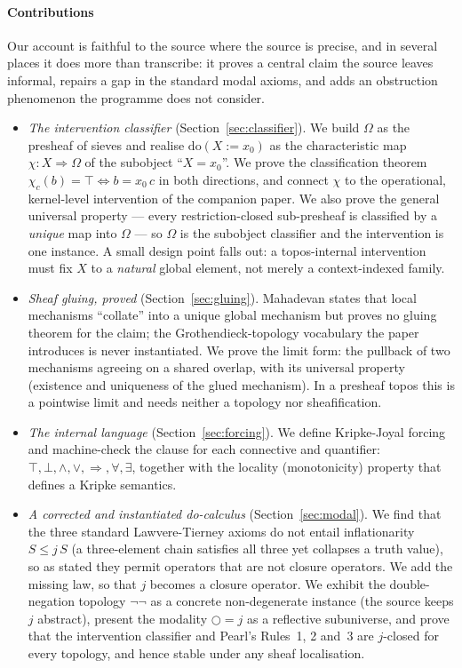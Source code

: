 \documentclass{lmcs}
\newcommand{\Om}{\Omega}
\newcommand{\dom}[2]{\mathrm{do}(#1\!:=\!#2)}
\newcommand{\cl}{\bigcirc}
\newcommand{\nn}{\neg\neg}
\begin{document}
\paragraph{Contributions}
Our account is faithful to the source where the source is precise, and in several places it does more than transcribe: it proves a central claim the source leaves informal, repairs a gap in the standard modal axioms, and adds an obstruction phenomenon the programme does not consider.
\begin{itemize}
\item \emph{The intervention classifier} (Section~\ref{sec:classifier}). We build $\Om$ as the presheaf of sieves and realise $\dom{X}{x_0}$ as the characteristic map $\chi : X \Rightarrow \Om$ of the subobject ``$X = x_0$''. We prove the classification theorem $\chi_c(b) = \top \iff b = x_0\,c$ in both directions, and connect $\chi$ to the operational, kernel-level intervention of the companion paper. We also prove the general universal property --- every restriction-closed sub-presheaf is classified by a \emph{unique} map into $\Om$ --- so $\Om$ is the subobject classifier and the intervention is one instance. A small design point falls out: a topos-internal intervention must fix $X$ to a \emph{natural} global element, not merely a context-indexed family.
\item \emph{Sheaf gluing, proved} (Section~\ref{sec:gluing}). Mahadevan states that local mechanisms ``collate'' into a unique global mechanism but proves no gluing theorem for the claim; the Grothendieck-topology vocabulary the paper introduces is never instantiated. We prove the limit form: the pullback of two mechanisms agreeing on a shared overlap, with its universal property (existence and uniqueness of the glued mechanism). In a presheaf topos this is a pointwise limit and needs neither a topology nor sheafification.
\item \emph{The internal language} (Section~\ref{sec:forcing}). We define Kripke-Joyal forcing and machine-check the clause for each connective and quantifier: $\top, \bot, \wedge, \vee, \Rightarrow, \forall, \exists$, together with the locality (monotonicity) property that defines a Kripke semantics.
\item \emph{A corrected and instantiated do-calculus} (Section~\ref{sec:modal}). We find that the three standard Lawvere-Tierney axioms do not entail inflationarity $S \le j\,S$ (a three-element chain satisfies all three yet collapses a truth value), so as stated they permit operators that are not closure operators. We add the missing law, so that $j$ becomes a closure operator. We exhibit the double-negation topology $\nn$ as a concrete non-degenerate instance (the source keeps $j$ abstract), present the modality $\cl = j$ as a reflective subuniverse, and prove that the intervention classifier and Pearl's Rules~1, 2 and~3 are $j$-closed for every topology, and hence stable under any sheaf localisation.

\end{itemize}
\end{document}

